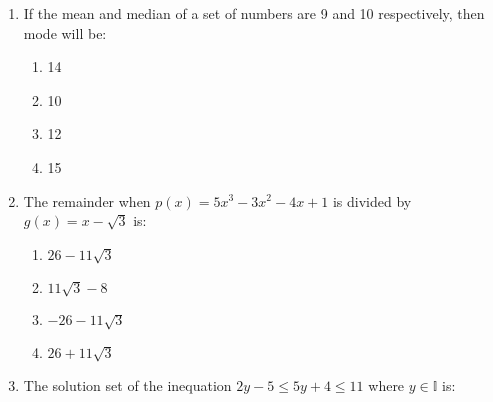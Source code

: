 \begin{enumerate}[label=(\roman*)]
        \begin{multicols}{2}
        \begin{enumerate}[label=(\alph*)]
            \item \rupee~11,400
            \item \rupee~14,400
            \item \rupee~13,680
            \item None of these.
        \end{enumerate}
        \end{multicols}

    \item If the mean and median of a set of numbers are 9 and 10 
        respectively, then mode will be:

        \begin{multicols}{2}
        \begin{enumerate}[label=(\alph*)]
            \item 14
            \item 10
            \item 12
            \item 15
        \end{enumerate}
        \end{multicols}

    \item The remainder when $p(x) = 5x^3 - 3x^2 - 4x + 1$ is divided by 
        $g(x) = x - \sqrt{3}$ is:

        \begin{multicols}{2}
        \begin{enumerate}[label=(\alph*)]
            \item $26 - 11\sqrt{3}$
            \item $11\sqrt{3} - 8$
            \item $-26 - 11\sqrt{3}$
            \item $26 + 11\sqrt{3}$
        \end{enumerate}
        \end{multicols}

    \item The solution set of the inequation $2y-5 \le 5y+4 \le 11$ where 
        $y \in \mathbb{I}$ is:


\end{enumerate}
